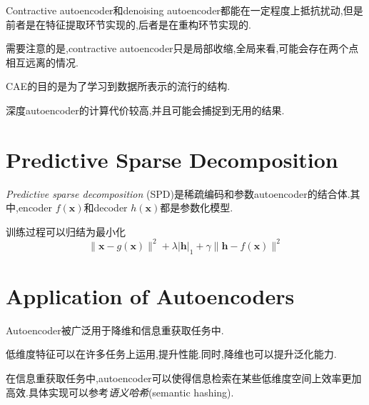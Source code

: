 Contractive autoencoder和denoising autoencoder都能在一定程度上抵抗扰动,但是前者是在特征提取环节实现的,后者是在重构环节实现的.

需要注意的是,contractive autoencoder只是局部收缩,全局来看,可能会存在两个点相互远离的情况.

CAE的目的是为了学习到数据所表示的流行的结构.

深度autoencoder的计算代价较高,并且可能会捕捉到无用的结果.

\section{Predictive Sparse Decomposition}

\textit{Predictive sparse decomposition} (SPD)是稀疏编码和参数autoencoder的结合体.其中,encoder $f(\bm x)$和decoder $h(\bm x)$都是参数化模型.

训练过程可以归结为最小化
\begin{equation}
\|\bm x-g(\bm x)\|^2+\lambda|\bm h|_1+\gamma\|\bm h-f(\bm x)\|^2
\end{equation}

\section{Application of Autoencoders}

Autoencoder被广泛用于降维和信息重获取任务中.

低维度特征可以在许多任务上运用,提升性能.同时,降维也可以提升泛化能力.

在信息重获取任务中,autoencoder可以使得信息检索在某些低维度空间上效率更加高效.具体实现可以参考\textit{语义哈希}(semantic hashing).